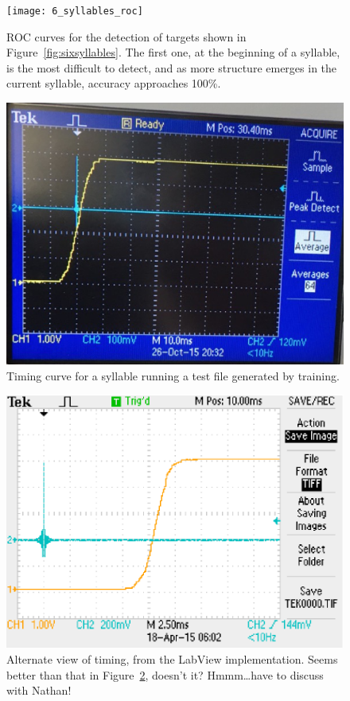 \documentclass{article}
\newcommand\fig[1]{Figure~\ref{#1}}
\begin{document}
\begin{figure}
  \texttt{[image: 6\_syllables\_roc]}
  \caption{ROC curves for the detection of targets shown in Figure~\ref{fig:sixsyllables}. The first one, at the beginning of a syllable, is the most difficult to detect, and as more structure emerges in the current syllable, accuracy approaches 100\%.}
  \label{fig:roc}
\end{figure}

\begin{figure}
  \includegraphics[width=\textwidth]{timing_nathan}
  \caption{Timing curve for a syllable running a test file generated by training.}
  \label{fig:timing_nathan}
\end{figure}

\begin{figure}
  \includegraphics[width=\textwidth]{detector-timing-2}
  \caption{Alternate view of timing, from the LabView implementation. Seems better than that in \fig{fig:timing_nathan}, doesn't it? Hmmm\dots have to discuss with Nathan!}
  \label{fig:timing_ben}
\end{figure}
\end{document}
